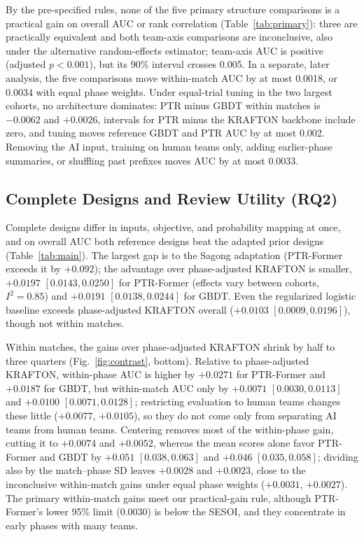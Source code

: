 \documentclass[sigconf,anonymous]{acmart}
\begin{document}

By the pre-specified rules, none of the five primary structure comparisons is a practical gain on overall AUC or rank correlation (Table~\ref{tab:primary}): three are practically equivalent and both team-axis comparisons are inconclusive, also under the alternative random-effects estimator; team-axis AUC is positive (adjusted $p<0.001$), but its 90\% interval crosses 0.005. In a separate, later analysis, the five comparisons move within-match AUC by at most 0.0018, or 0.0034 with equal phase weights. Under equal-trial tuning in the two largest cohorts, no architecture dominates: PTR minus GBDT within matches is $-0.0062$ and $+0.0026$, intervals for PTR minus the KRAFTON backbone include zero, and tuning moves reference GBDT and PTR AUC by at most 0.002. Removing the AI input, training on human teams only, adding earlier-phase summaries, or shuffling past prefixes moves AUC by at most 0.0033.

\subsection{Complete Designs and Review Utility (RQ2)}
\label{sec:results:designs}

Complete designs differ in inputs, objective, and probability mapping at once, and on overall AUC both reference designs beat the adapted prior designs (Table~\ref{tab:main}). The largest gap is to the Sagong adaptation (PTR-Former exceeds it by $+0.092$); the advantage over phase-adjusted KRAFTON is smaller, $+0.0197$ $[0.0143,\allowbreak 0.0250]$ for PTR-Former (effects vary between cohorts, $I^2=0.85$) and $+0.0191$ $[0.0138,\allowbreak 0.0244]$ for GBDT. Even the regularized logistic baseline exceeds phase-adjusted KRAFTON overall ($+0.0103$ $[0.0009,\allowbreak 0.0196]$), though not within matches.

Within matches, the gains over phase-adjusted KRAFTON shrink by half to three quarters (Fig.~\ref{fig:contrast}, bottom). Relative to phase-adjusted KRAFTON, within-phase AUC is higher by $+0.0271$ for PTR-Former and $+0.0187$ for GBDT, but within-match AUC only by $+0.0071$ $[0.0030,\allowbreak 0.0113]$ and $+0.0100$ $[0.0071,\allowbreak 0.0128]$; restricting evaluation to human teams changes these little ($+0.0077$, $+0.0105$), so they do not come only from separating AI teams from human teams. Centering removes most of the within-phase gain, cutting it to $+0.0074$ and $+0.0052$, whereas the mean scores alone favor PTR-Former and GBDT by $+0.051$ $[0.038,\allowbreak 0.063]$ and $+0.046$ $[0.035,\allowbreak 0.058]$; dividing also by the match--phase SD leaves $+0.0028$ and $+0.0023$, close to the inconclusive within-match gains under equal phase weights ($+0.0031$, $+0.0027$). The primary within-match gains meet our practical-gain rule, although PTR-Former's lower 95\% limit (0.0030) is below the SESOI, and they concentrate in early phases with many teams.
\end{document}
